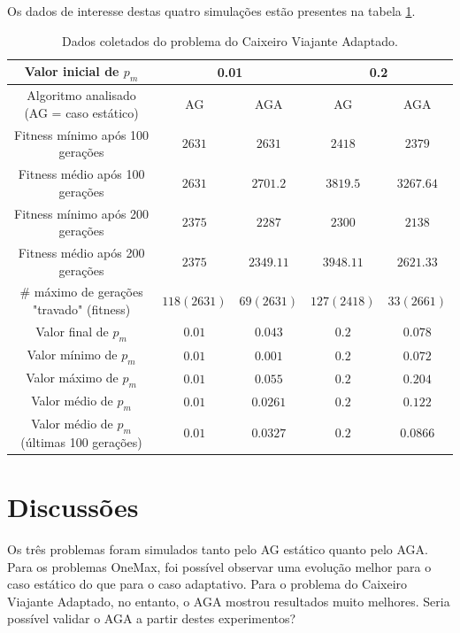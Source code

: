 Os dados de interesse destas quatro simulações estão presentes na tabela \ref{tab:tsp}.

\begin{table}
\caption{Dados coletados do problema do Caixeiro Viajante Adaptado.}
\label{tab:tsp}

\centering
\begin{tabular}[!hbt]{|c|cc|cc|}
	\hline
	Valor inicial de $p_m$						& \multicolumn{2}{c|}{0.01}		& \multicolumn{2}{c|}{0.2}		\\
	\hline
	Algoritmo analisado (AG = caso estático)	& AG			& AGA			& AG			& AGA			\\
	\hline
	Fitness mínimo após 100 gerações			& $2631$		& $2631$		& $2418$		& $2379$		\\
	Fitness médio após 100 gerações				& $2631$		& $2701.2$		& $3819.5$		& $3267.64$		\\
	Fitness mínimo após 200 gerações 			& $2375$		& $2287$		& $2300$		& $2138$		\\
	Fitness médio após 200 gerações 			& $2375$		& $2349.11$		& $3948.11$		& $2621.33$		\\
	\# máximo de gerações "travado" (fitness)	& $118 (2631)$	& $69 (2631)$	& $127 (2418)$	& $33 (2661)$	\\
	Valor final de $p_m$						& $0.01$		& $0.043$		& $0.2$			& $0.078$		\\
	Valor mínimo de $p_m$						& $0.01$		& $0.001$		& $0.2$			& $0.072$		\\
	Valor máximo de $p_m$						& $0.01$		& $0.055$		& $0.2$			& $0.204$		\\
	Valor médio de $p_m$						& $0.01$		& $0.0261$		& $0.2$			& $0.122$		\\
	Valor médio de $p_m$ (últimas 100 gerações)	& $0.01$		& $0.0327$		& $0.2$			& $0.0866$		\\
	\hline
\end{tabular}
\end{table}

\section{Discussões}

Os três problemas foram simulados tanto pelo AG estático quanto pelo AGA. Para os problemas OneMax, foi possível observar uma evolução melhor para o caso estático do que para o caso adaptativo. Para o problema do Caixeiro Viajante Adaptado, no entanto, o AGA mostrou resultados muito melhores. Seria possível validar o AGA a partir destes experimentos?

